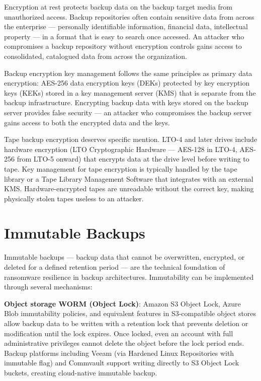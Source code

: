 Encryption at rest protects backup data on the backup target media from unauthorized access. Backup repositories often contain sensitive data from across the enterprise --- personally identifiable information, financial data, intellectual property --- in a format that is easy to search once accessed. An attacker who compromises a backup repository without encryption controls gains access to consolidated, catalogued data from across the organization.

Backup encryption key management follows the same principles as primary data encryption: AES-256 data encryption keys (DEKs) protected by key encryption keys (KEKs) stored in a key management server (KMS) that is separate from the backup infrastructure. Encrypting backup data with keys stored on the backup server provides false security --- an attacker who compromises the backup server gains access to both the encrypted data and the keys.

Tape backup encryption deserves specific mention. LTO-4 and later drives include hardware encryption (LTO Cryptographic Hardware --- AES-128 in LTO-4, AES-256 from LTO-5 onward) that encrypts data at the drive level before writing to tape. Key management for tape encryption is typically handled by the tape library or a Tape Library Management Software that integrates with an external KMS. Hardware-encrypted tapes are unreadable without the correct key, making physically stolen tapes useless to an attacker.

\section{Immutable Backups}
Immutable backups --- backup data that cannot be overwritten, encrypted, or deleted for a defined retention period --- are the technical foundation of ransomware resilience in backup architectures. Immutability can be implemented through several mechanisms:

\textbf{Object storage WORM (Object Lock)}: Amazon S3 Object Lock, Azure Blob immutability policies, and equivalent features in S3-compatible object stores allow backup data to be written with a retention lock that prevents deletion or modification until the lock expires. Once locked, even an account with full administrative privileges cannot delete the object before the lock period ends. Backup platforms including Veeam (via Hardened Linux Repositories with immutable flag) and Commvault support writing directly to S3 Object Lock buckets, creating cloud-native immutable backup.

